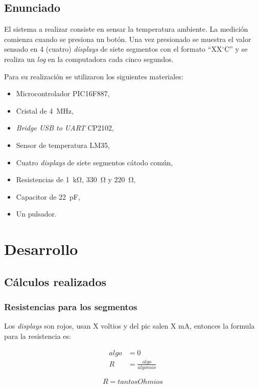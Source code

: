 \documentclass[12pt,a4paper]{article}
\begin{document}
\subsection{Enunciado}
	El sistema a realizar consiste en sensar la temperatura ambiente. La medición comienza cuando se presiona un botón. Una vez presionado se muestra el valor sensado en 4 (cuatro) \emph{displays} de siete segmentos con el formato ``XX$^{\circ}$C'' y se realiza un \emph{log} en la computadora cada cinco segundos.
	
	Para su realización se utilizaron los siguientes materiales:
	
	\begin{itemize}[leftmargin=1.5cm,nosep]
	\item Microcontrolador PIC16F887,
	\item Cristal de \SI{4}{\MHz},
	\item \emph{Bridge USB to UART} CP2102,
	\item Sensor de temperatura LM35,
	\item Cuatro \emph{displays} de siete segmentos cátodo común,
	\item Resistencias de \SI{1}{\kilo\ohm}, \SI{330}{\ohm} y \SI{220}{\ohm},
	\item Capacitor de \SI{22}{\pico\F},
	\item Un pulsador.
	\end{itemize}

\section{Desarrollo}
		
\subsection{Cálculos realizados}

\subsubsection{Resistencias para los segmentos}
	Los \emph{displays} son rojos, usan X voltios y del pic salen X mA, entonces la formula para la resistencia es:
	
	\begin{align*}
	algo &= 0\\
	R &= \frac{algo}{algomas}
	\end{align*}
	
	\begin{equation}
	R = tantos Ohmios
	\end{equation}		
	
\end{document}

